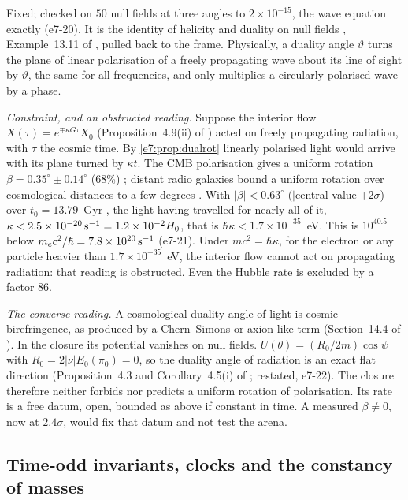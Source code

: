 Fixed; checked on $50$ null fields at three angles to $2\times10^{-15}$, the wave equation exactly (e7-20). It is the identity of helicity and
duality on null fields \cite{Calkin65,PenroseRindler84}, Example~13.11 of \cite{ES17}, pulled back to the frame. Physically, a duality angle
$\vartheta$ turns the plane of linear polarisation of a freely propagating wave about its line of sight by $\vartheta$, the same for all
frequencies, and only multiplies a circularly polarised wave by a phase.

\emph{Constraint, and an obstructed reading.} Suppose the interior flow $X(\tau)=e^{\mp\kappa G\tau}X_0$ (Proposition~4.9(ii) of \cite{RE}) acted on
freely propagating radiation, with $\tau$ the cosmic time. By \cref{e7:prop:dualrot} linearly polarised light would arrive with its plane turned by
$\kappa t$. The CMB polarisation gives a uniform rotation $\beta=0.35^\circ\pm0.14^\circ$ (68\%) \cite{MinamiKomatsu20}; distant radio galaxies bound
a uniform rotation over cosmological distances to a few degrees \cite{CarrollFieldJackiw90}. With $|\beta|<0.63^\circ$ ($|$central value$|+2\sigma$)
over $t_0=13.79$~Gyr \cite{Planck18VI}, the light having travelled for nearly all of it, $\kappa<2.5\times10^{-20}\,{\rm s^{-1}}=1.2\times10^{-2}H_0$,
that is $\hbar\kappa<1.7\times10^{-35}$~eV. This is $10^{40.5}$ below $m_ec^2/\hbar=7.8\times10^{20}\,{\rm s^{-1}}$ (e7-21). Under $mc^2=\hbar\kappa$,
for the electron or any particle heavier than $1.7\times10^{-35}$~eV, the interior flow cannot act on propagating radiation: that reading is
obstructed. Even the Hubble rate is excluded by a factor $86$.

\emph{The converse reading.} A cosmological duality angle of light is cosmic birefringence, as produced by a Chern--Simons or axion-like term
\cite{CarrollFieldJackiw90} (Section~14.4 of \cite{ES17}). In the closure its potential vanishes on null fields. $U(\theta)=(R_0/2m)\cos\psi$ with
$R_0=2|\nu|E_0(\pi_0)=0$, so the duality angle of radiation is an exact flat direction (Proposition~4.3 and Corollary~4.5(i) of \cite{RE}; restated,
e7-22). The closure therefore neither forbids nor predicts a uniform rotation of polarisation. Its rate is a free datum, open, bounded as above
if constant in time. A measured $\beta\neq0$, now at $2.4\sigma$, would fix that datum and not test the arena.

\subsection{Time-odd invariants, clocks and the constancy of masses}
\label{e7:sec:timeodd}

